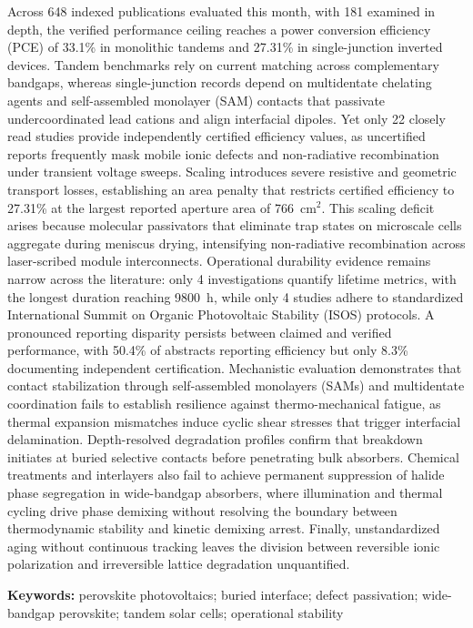 \documentclass[
  11pt,
]{article}
\begin{document}
Across 648 indexed publications evaluated this month, with 181 examined
in depth, the verified performance ceiling reaches a power conversion
efficiency (PCE) of 33.1\% in monolithic tandems and 27.31\% in
single-junction inverted devices. Tandem benchmarks rely on current
matching across complementary bandgaps, whereas single-junction records
depend on multidentate chelating agents and self-assembled monolayer
(SAM) contacts that passivate undercoordinated lead cations and align
interfacial dipoles. Yet only 22 closely read studies provide
independently certified efficiency values, as uncertified reports
frequently mask mobile ionic defects and non-radiative recombination
under transient voltage sweeps. Scaling introduces severe resistive and
geometric transport losses, establishing an area penalty that restricts
certified efficiency to 27.31\% at the largest reported aperture area of
\qty{766}{\centi\meter}\(^2\). This scaling deficit arises because
molecular passivators that eliminate trap states on microscale cells
aggregate during meniscus drying, intensifying non-radiative
recombination across laser-scribed module interconnects. Operational
durability evidence remains narrow across the literature: only 4
investigations quantify lifetime metrics, with the longest duration
reaching \qty{9800}{\hour}, while only 4 studies adhere to standardized
International Summit on Organic Photovoltaic Stability (ISOS) protocols.
A pronounced reporting disparity persists between claimed and verified
performance, with 50.4\% of abstracts reporting efficiency but only
8.3\% documenting independent certification. Mechanistic evaluation
demonstrates that contact stabilization through self-assembled
monolayers (SAMs) and multidentate coordination fails to establish
resilience against thermo-mechanical fatigue, as thermal expansion
mismatches induce cyclic shear stresses that trigger interfacial
delamination. Depth-resolved degradation profiles confirm that breakdown
initiates at buried selective contacts before penetrating bulk
absorbers. Chemical treatments and interlayers also fail to achieve
permanent suppression of halide phase segregation in wide-bandgap
absorbers, where illumination and thermal cycling drive phase demixing
without resolving the boundary between thermodynamic stability and
kinetic demixing arrest. Finally, unstandardized aging without
continuous tracking leaves the division between reversible ionic
polarization and irreversible lattice degradation unquantified.

\textbf{Keywords:} perovskite photovoltaics; buried interface; defect
passivation; wide-bandgap perovskite; tandem solar cells; operational
stability
\end{document}

